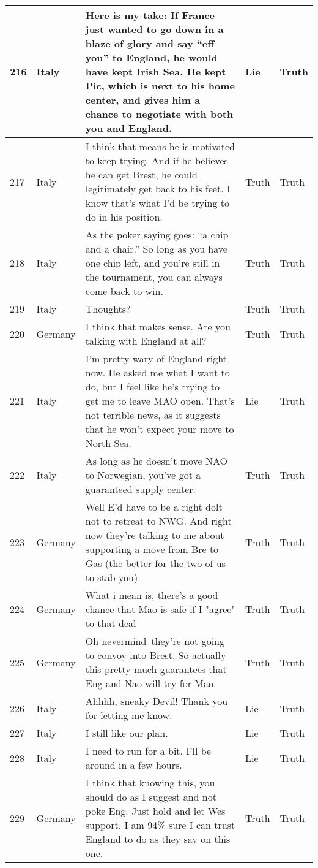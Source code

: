 \begin{longtable}{p{.3 cm} p{1.25cm} p{8.25cm} p{1.1cm} p{1.1cm}}
		\hline
		216 & Italy & Here is my take: If France just wanted to go down in a blaze of glory and say ``eff you'' to England, he would have kept Irish Sea. He kept Pic, which is next to his home center, and gives him a chance to negotiate with both you and England. & Lie & Truth \\
		\hline
		217 & Italy & I think that means he is motivated to keep trying. And if he believes he can get Brest, he could legitimately get back to his feet. I know that's what I'd be trying to do in his position. & Truth & Truth \\
		\hline
		218 & Italy & As the poker saying goes: ``a chip and a chair.'' So long as you have one chip left, and you're still in the tournament, you can always come back to win. & Truth & Truth \\
		\hline
		219 & Italy & Thoughts? & Truth & Truth \\
		\hline
		220 & Germany & I think that makes sense. Are you talking with England at all? & Truth & Truth \\
		\hline
		221 & Italy & I'm pretty wary of England right now. He asked me what I want to do, but I feel like he's trying to get me to leave MAO open. That's not terrible news, as it suggests that he won't expect your move to North Sea. & Lie & Truth \\
		\hline
		222 & Italy & As long as he doesn't move NAO to Norwegian, you've got a guaranteed supply center. & Truth & Truth \\
		\hline
		223 & Germany & Well E'd have to be a right dolt not to retreat to NWG. And right now they're talking to me about supporting a move from Bre to Gas (the better for the two of us to stab you). & Truth & Truth \\
		\hline
		224 & Germany & What i mean is, there's a good chance that Mao is safe if I "agree" to that deal & Truth & Truth \\
		\hline
		225 & Germany & Oh nevermind--they're not going to convoy into Brest. So actually this pretty much guarantees that Eng and Nao will try for Mao. & Truth & Truth \\
		\hline
		226 & Italy & Ahhhh, sneaky Devil! Thank you for letting me know. & Lie & Truth \\
		\hline
		227 & Italy & I still like our plan. & Lie & Truth \\
		\hline
		228 & Italy & I need to run for a bit. I'll be around in a few hours. & Lie & Truth \\
		\hline
		229 & Germany & I think that knowing this, you should do as I suggest and not poke Eng. Just hold and let Wes support. I am 94\% sure I can trust England to do as they say on this one. & Truth & Truth \\

\end{longtable}
